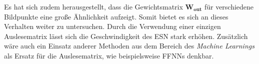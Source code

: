 Es hat sich zudem herausgestellt, dass die Gewichtsmatrix $\mathbf{W_{out}}$ für verschiedene Bildpunkte eine große Ähnlichkeit aufzeigt. Somit bietet es sich an dieses Verhalten weiter zu untersuchen. Durch die Verwendung einer einzigen Auslesematrix lässt sich die Geschwindigkeit des \textsc{ESN} stark erhöhen. Zusätzlich wäre auch ein Einsatz anderer Methoden aus dem Bereich des \textit{Machine Learnings} als Ersatz für die Auslesematrix, wie beispielsweise \textsc{FFNN}s denkbar.  